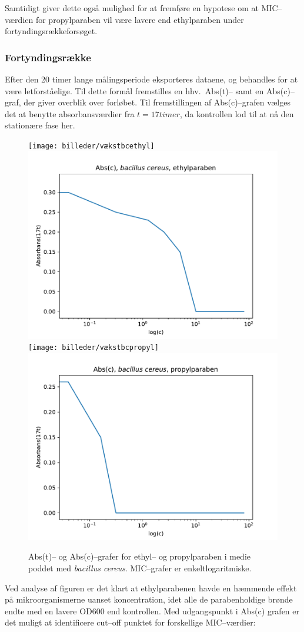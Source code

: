     Samtidigt giver dette også mulighed for at fremføre en hypotese om at MIC--værdien for propylparaben vil være lavere end ethylparaben under fortyndingsrækkeforsøget.

    \subsubsection{Fortyndingsrække}
    Efter den 20 timer lange målingsperiode eksporteres dataene, og behandles for at være letforståelige. Til dette formål fremstilles en hhv.\ Abs(t)-- samt en Abs(c)--graf, der giver overblik over forløbet. Til fremstillingen af Abs(c)--grafen vælges det at benytte absorbansværdier fra $t=17\si{timer}$, da kontrollen lod til at nå den stationære fase her.
    \begin{figure}[H]\centering
        \texttt{[image: billeder/vækstbcethyl]}
        \includegraphics[width=.49\linewidth]{billeder/micbcethyl}
        \texttt{[image: billeder/vækstbcpropyl]}
        \includegraphics[width=.49\linewidth]{billeder/micbcpropyl}
        \caption{Abs(t)-- og Abs(c)--grafer for ethyl-- og propylparaben i medie poddet med \textit{bacillus cereus}. MIC--grafer er enkeltlogaritmiske.}
    \end{figure}
    Ved analyse af figuren er det klart at ethylparabenen havde en hæmmende effekt på mikroorganismerne uanset koncentration, idet alle de parabenholdige brønde endte med en lavere OD600 end kontrollen. Med udgangspunkt i Abs(c) grafen er det muligt at identificere cut--off punktet for forskellige MIC--værdier:

